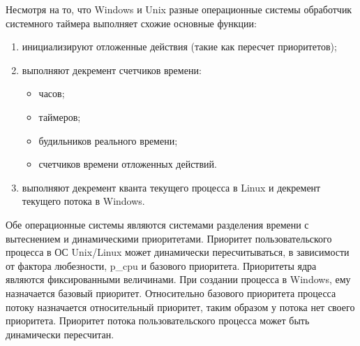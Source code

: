 Несмотря на то, что Windows и Unix разные операционные системы обработчик системного таймера выполняет схожие основные функции:
\begin{enumerate}
	\item инициализируют отложенные действия (такие как пересчет приоритетов);
	\item выполняют декремент счетчиков времени:
	\begin{itemize}
		\item часов;
		\item таймеров;
		\item будильников реального времени;
		\item счетчиков времени отложенных действий.
	\end{itemize}
	\item выполняют декремент кванта текущего процесса в Linux и декремент текущего потока
	в Windows.
\end{enumerate}

Обе операционные системы являются системами разделения времени с вытеснением и
динамическими приоритетами.
Приоритет пользовательского процесса в ОС Unix/Linux может динамически пересчитываться, в зависимости от фактора любезности, p\_cpu и базового приоритета. Приоритеты
ядра являются фиксированными величинами.
При создании процесса в Windows, ему назначается базовый приоритет. Относительно
базового приоритета процесса потоку назначается относительный приоритет, таким образом
у потока нет своего приоритета. Приоритет потока пользовательского процесса может быть
динамически пересчитан.